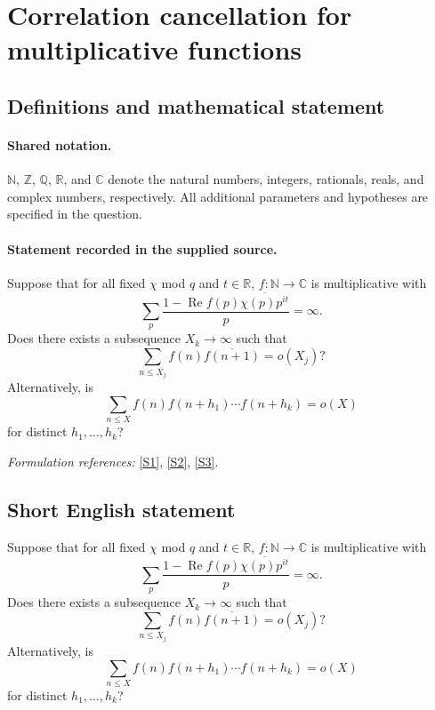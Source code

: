 \documentclass[11pt]{article}
\newcommand{\R}{\mathbb R}
\newcommand{\N}{\mathbb N}
\newcommand{\C}{\mathbb C}
\newcommand{\sref}[2]{\hyperlink{source:#1:#2}{[S#2]}}
\begin{document}
\section{Correlation cancellation for multiplicative functions}\label{statement}

\subsection{Definitions and mathematical statement}

\paragraph{Shared notation.}$\mathbb N$, $\mathbb Z$, $\mathbb Q$, $\mathbb R$, and $\mathbb C$ denote the natural numbers, integers, rationals, reals, and complex numbers, respectively. All additional parameters and hypotheses are specified in the question.


\paragraph{Statement recorded in the supplied source.}
Suppose that for all fixed $\chi$ mod $q$ and $t \in \R$, $f:\N \to \C$ is multiplicative with
\begin{equation*}
 \sum_{p} \frac{1 - \operatorname{Re} f(p) \overline{\chi(p) p^{it}}}{p} = \infty.
\end{equation*}
Does there exists a subsequence $X_k \to \infty$ such that
\begin{equation*}
 \sum_{n \leq X_j} f(n) \overline{f(n+1)} = o(X_j)?
\end{equation*}
Alternatively, is
\begin{equation*}
 \sum_{n\leq X} f(n) f(n+h_1) \cdots f(n+h_k) = o(X)
\end{equation*}
for distinct $h_1, \dots, h_k$?
\par\smallskip\textit{Formulation references:} \sref{statement}{1}, \sref{statement}{2}, \sref{statement}{3}.
\subsection{Short English statement}
Suppose that for all fixed $\chi$ mod $q$ and $t \in \R$, $f:\N \to \C$ is multiplicative with
\begin{equation*}
 \sum_{p} \frac{1 - \operatorname{Re} f(p) \overline{\chi(p) p^{it}}}{p} = \infty.
\end{equation*}
Does there exists a subsequence $X_k \to \infty$ such that
\begin{equation*}
 \sum_{n \leq X_j} f(n) \overline{f(n+1)} = o(X_j)?
\end{equation*}
Alternatively, is
\begin{equation*}
 \sum_{n\leq X} f(n) f(n+h_1) \cdots f(n+h_k) = o(X)
\end{equation*}
for distinct $h_1, \dots, h_k$?
\end{document}
